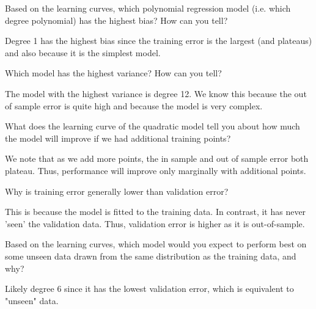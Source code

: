 \begin{problem}[3]
  Based on the learning curves, which polynomial regression model (i.e. which degree polynomial) has the highest bias? How can you tell?
\end{problem}
\begin{solution}
Degree 1 has the highest bias since the training error is the largest (and plateaus) and also because it is the simplest model.
\end{solution}

\begin{problem}[3]
  Which model has the highest variance? How can you tell?
\end{problem}
\begin{solution}
  The model with the highest variance is degree 12. We know this because the out of sample error is quite high and because the model is very complex.
\end{solution}

\begin{problem}[3]
  What does the learning curve of the quadratic model tell you about how much the model will improve if we had additional training points?
\end{problem}
\begin{solution}
We note that as we add more points, the in sample and out of sample error both plateau. Thus, performance will improve only marginally with additional points.
\end{solution}

\begin{problem}[3]
  Why is training error generally lower than validation error?
\end{problem}
\begin{solution}
  This is because the model is fitted to the training data. In contrast, it has never 'seen' the validation data. Thus, validation error is higher as it is out-of-sample.
\end{solution}

\begin{problem}[3]
  Based on the learning curves, which model would you expect to perform best on some unseen data drawn from the same distribution as the training data, and why?
\end{problem}
\begin{solution}
  Likely degree 6 since it has the lowest validation error, which is equivalent to "unseen" data.
\end{solution}




